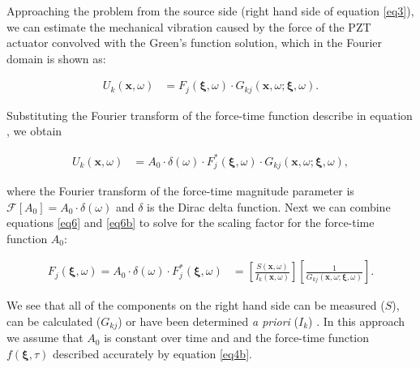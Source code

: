 \documentclass[preprint,3p, 11pt,authoryear]{elsarticle}
\begin{document}
{Approaching the problem from the source side (right hand side of equation \eqref{eq3}), we can estimate the mechanical vibration caused by the force of the PZT actuator convolved with the Green's function solution, which in the Fourier domain is shown as:

\begin{equation}
    \label{eq6a}
\begin{split}
U_{k}\left( \mathbf{x}, \omega \right) & = 
       F_{j}\left( \mathbf{\xi}, \omega \right)  \cdot G_{kj}\left(  \mathbf{x}, \omega; \mathbf{\xi}, \omega\right).
\end{split}
\end{equation}

\noindent Substituting the Fourier transform of the force-time function describe in equation , we obtain

\begin{equation}
    \label{eq6b}
\begin{split}
U_{k}\left( \mathbf{x}, \omega \right) & = 
       A_{0}\cdot \delta (\omega)\cdot F^{*}_{j}\left( \mathbf{\xi}, \omega \right)  \cdot G_{kj}\left(  \mathbf{x}, \omega; \mathbf{\xi}, \omega\right),
\end{split}
\end{equation}

\noindent where the Fourier transform of the force-time magnitude parameter is $\mathcal{F}[A_{0}] = A_{0}\cdot\delta(\omega)$ and $\delta$ is the Dirac delta function.  Next we can combine equations \eqref{eq6} and \eqref{eq6b} to solve for the scaling factor for the force-time function $A_{0}$:


\begin{equation}
    \label{eq6c}
\begin{split}
 F_{j}\left( \mathbf{\xi}, \omega \right) = A_{0}\cdot \delta (\omega)  \cdot F^{*}_{j}\left( \mathbf{\xi}, \omega \right) & 
=\left[ \frac{S\left( \mathbf{x}, \omega \right) } 
{ I_{k}\left( \mathbf{x},\omega \right)} \right]
\left[ \frac{1}{ G_{kj}\left(  \mathbf{x}, \omega; \mathbf{\xi}, \omega\right)} \right].
\end{split}
\end{equation}

\noindent We see that all of the components on the right hand side can be measured ($S$), can be calculated ($G_{kj}$) or have been determined \textit{a priori} ($I_{k}$) . In this approach we assume that $A_{0}$ is constant over time and and the force-time function $f(\mathbf{\xi}, \tau)$ described accurately by equation \eqref{eq4b}.



}
\end{document}
